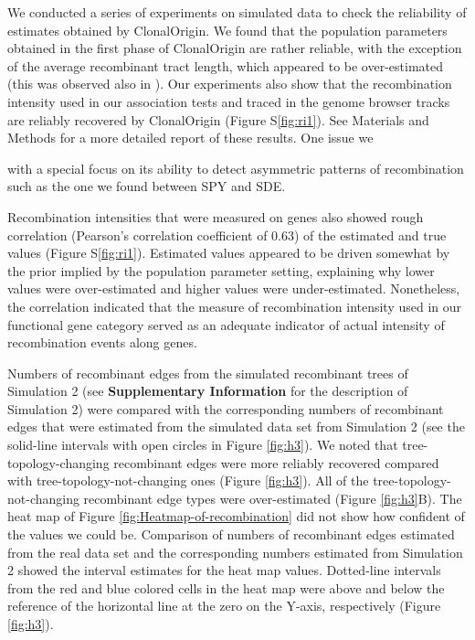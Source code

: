 \documentclass[10pt]{article}
\let\citep\cite
\begin{document}
We conducted a series of experiments on simulated data to check the reliability of estimates obtained by ClonalOrigin. We found that the population parameters obtained in the first phase of ClonalOrigin are rather reliable, with the exception of the average recombinant tract length, which appeared to be over-estimated (this was observed also in \citep{Didelot2010}). Our experiments also show that the recombination intensity used in our association tests and traced in the genome browser tracks are reliably recovered by ClonalOrigin (Figure S\ref{fig:ri1}). See Materials and Methods for a more detailed report of these results. One issue we 


 with a special focus on its ability to detect asymmetric patterns of recombination such as the one we found between SPY and SDE. 

Recombination intensities that were measured on genes also showed rough
correlation (Pearson's correlation coefficient of 0.63) of the estimated and
true values (Figure S\ref{fig:ri1}).  Estimated values appeared to be driven
somewhat by the prior implied by the population parameter setting, explaining
why lower values were over-estimated and higher values were under-estimated.
Nonetheless, the correlation indicated that the measure of recombination
intensity used in our functional gene category served as an adequate indicator
of actual intensity of recombination events along genes.


Numbers of 
recombinant edges from the simulated recombinant trees of Simulation 2 (see
\textbf{Supplementary Information} for the description of Simulation 2) were
compared with the corresponding numbers of recombinant edges that were estimated
from the simulated data set from Simulation 2 (see the solid-line intervals with
open circles in Figure \ref{fig:h3}).  We noted that tree-topology-changing
recombinant edges were more reliably recovered compared with
tree-topology-not-changing ones (Figure \ref{fig:h3}). All of the
tree-topology-not-changing recombinant edge types were over-estimated (Figure
\ref{fig:h3}B). The heat map of Figure \ref{fig:Heatmap-of-recombination} did
not show how confident of the values we could be. Comparison of numbers of
recombinant edges estimated from the real data set and the corresponding numbers
estimated from Simulation 2 showed the interval estimates for the heat map
values.  Dotted-line intervals from the red and blue colored cells in the heat
map were above and below the reference of the horizontal line at the zero on the
Y-axis, respectively (Figure \ref{fig:h3}).  
\end{document}
